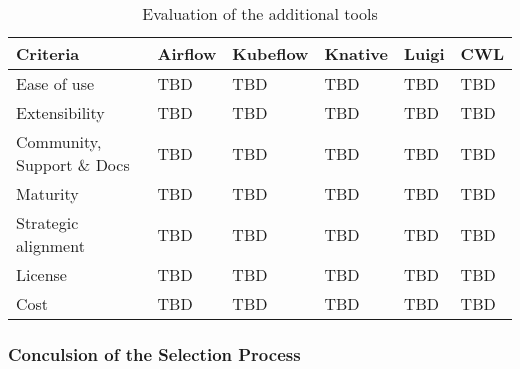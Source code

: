 \begin{table}[htb]
    \centering
    \begin{tabular}{|l|l|l|l|l|l|} \hline
        \textbf{Criteria}                                          & \textbf{Airflow}      & \textbf{Kubeflow}     & \textbf{Knative}      & \textbf{Luigi}        & \textbf{CWL}          \\ \hline
        Ease of use                                                & TBD                   & TBD                   & TBD                   & TBD                   & TBD                   \\ \hline
        Extensibility                                              & TBD                   & TBD                   & TBD                   & TBD                   & TBD                   \\ \hline
        Community, Support \& Docs                                 & TBD                   & TBD                   & TBD                   & TBD                   & TBD                   \\ \hline
        Maturity                                                   & TBD                   & TBD                   & TBD                   & TBD                   & TBD                   \\ \hline
        Strategic alignment                                        & TBD                   & TBD                   & TBD                   & TBD                   & TBD                   \\ \hline
        License                                                    & TBD                   & TBD                   & TBD                   & TBD                   & TBD                   \\ \hline
        Cost                                                       & TBD                   & TBD                   & TBD                   & TBD                   & TBD                   \\ \hline

    \end{tabular}
    \caption{Evaluation of the additional tools}
    \label{tab:evaluation_of_the_additional_tools}
\end{table}

\subsubsection{Conculsion of the Selection Process}

\blindtext[1]
